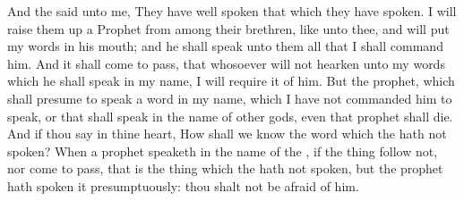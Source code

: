 \begin{biblechapter}
\verse And the \LORD said unto me, They have well spoken that which they have spoken.
\verse I will raise them up a Prophet from among their brethren, like unto thee, and will put my words in his mouth; and he shall speak unto them all that I shall command him.
\verse And it shall come to pass, that whosoever will not hearken unto my words which he shall speak in my name, I will require it of him.
\verse But the prophet, which shall presume to speak a word in my name, which I have not commanded him to speak, or that shall speak in the name of other gods, even that prophet shall die.
\verse And if thou say in thine heart, How shall we know the word which the \LORD hath not spoken?
\verse When a prophet speaketh in the name of the \LORD, if the thing follow not, nor come to pass, that is the thing which the \LORD hath not spoken, but the prophet hath spoken it presumptuously: thou shalt not be afraid of him.
\end{biblechapter}

